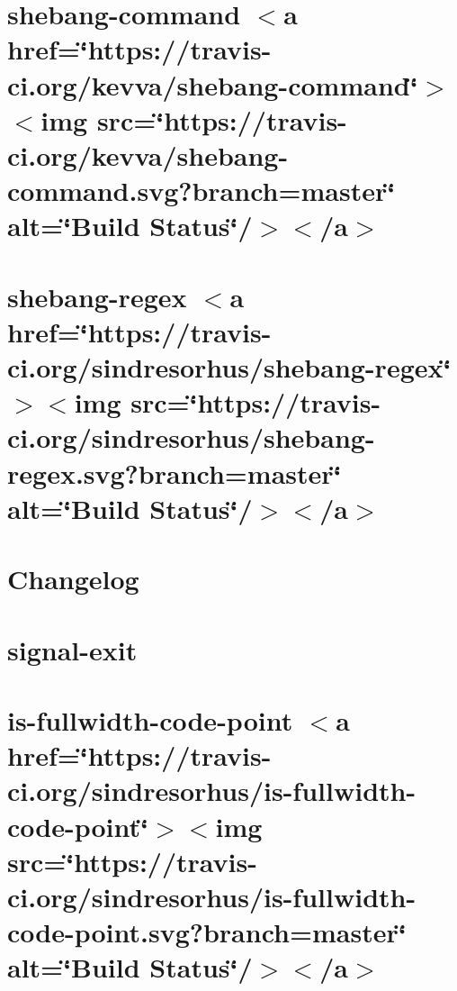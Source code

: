 \let\mypdfximage\pdfximage\def\pdfximage{\immediate\mypdfximage}\documentclass[twoside]{book}
\newcommand{\+}{\discretionary{\mbox{\scriptsize$\hookleftarrow$}}{}{}}
\begin{document}
\chapter{shebang-\/command $<$a href=\char`\"{}https\+://travis-\/ci.\+org/kevva/shebang-\/command\char`\"{}$>$$<$img src=\char`\"{}https\+://travis-\/ci.\+org/kevva/shebang-\/command.\+svg?branch=master\char`\"{} alt=\char`\"{}\+Build Status\char`\"{}/$>$$<$/a$>$}
\label{md_heap-visualizer_node_modules_shebang-command_readme}

\chapter{shebang-\/regex $<$a href=\char`\"{}https\+://travis-\/ci.\+org/sindresorhus/shebang-\/regex\char`\"{}$>$$<$img src=\char`\"{}https\+://travis-\/ci.\+org/sindresorhus/shebang-\/regex.\+svg?branch=master\char`\"{} alt=\char`\"{}\+Build Status\char`\"{}/$>$$<$/a$>$}
\label{md_heap-visualizer_node_modules_shebang-regex_readme}

\chapter{Changelog}
\label{md_heap-visualizer_node_modules_signal-exit__c_h_a_n_g_e_l_o_g}

\chapter{signal-\/exit}
\label{md_heap-visualizer_node_modules_signal-exit__r_e_a_d_m_e}

\chapter{is-\/fullwidth-\/code-\/point $<$a href=\char`\"{}https\+://travis-\/ci.\+org/sindresorhus/is-\/fullwidth-\/code-\/point\char`\"{}$>$$<$img src=\char`\"{}https\+://travis-\/ci.\+org/sindresorhus/is-\/fullwidth-\/code-\/point.\+svg?branch=master\char`\"{} alt=\char`\"{}\+Build Status\char`\"{}/$>$$<$/a$>$}
\label{md_heap-visualizer_node_modules_slice-ansi_node_modules_is-fullwidth-code-point_readme}

\end{document}

